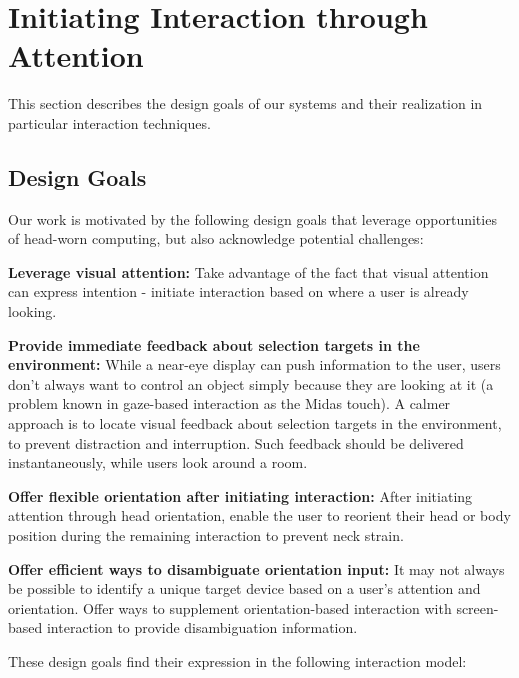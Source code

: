 \section{Initiating Interaction through Attention}
This section describes the design goals of our systems and their realization in particular interaction techniques.

\subsection{Design Goals}
Our work is motivated by the following design goals that leverage opportunities of head-worn computing, but also acknowledge potential challenges:

{\bf Leverage visual attention:} Take advantage of the fact that visual attention can express intention - initiate interaction based on where a user is already looking. 

{\bf Provide immediate feedback about selection targets in the environment:} While a near-eye display can push information to the user, users don't always want to control an object simply because they are looking at it (a problem known in gaze-based interaction as the Midas touch). A calmer~\cite{weiser_coming_1997} approach is to locate visual feedback about selection targets in the environment, to prevent distraction and interruption. Such feedback should be delivered instantaneously, while users look around a room.

{\bf Offer flexible orientation after initiating interaction:} After initiating attention through head orientation, enable the user to reorient their head or body position during the remaining interaction to prevent neck strain.

{\bf Offer efficient ways to disambiguate orientation input:} It may not always be possible to identify a unique target device based on a user's attention and orientation. Offer ways to supplement orientation-based interaction with screen-based interaction to provide disambiguation information.

These design goals find their expression in the following interaction model:



